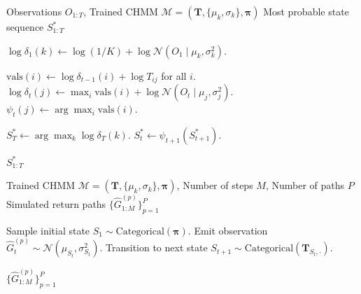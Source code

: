 \newcommand{\algbaumwelch}{\ref{alg:chmm_em}}
\newcommand{\algecmstudentt}{\ref{alg:chmm_em}}
\newcommand{\algemlaplace}{\ref{alg:chmm_em}}

\begin{algorithm}[tp]
\caption{Viterbi decoding for the most likely hidden state sequence}
\label{alg:viterbi}
\small
\begin{algorithmic}[1]
\REQUIRE Observations $O_{1:T}$, Trained CHMM $\mathcal{M} = (\mathbf{T}, \{\mu_k, \sigma_k\}, \boldsymbol{\pi})$
\ENSURE Most probable state sequence $S_{1:T}^*$

    \STATE $\log \delta_1(k) \leftarrow \log(1/K) + \log \mathcal{N}(O_1 \mid \mu_k, \sigma_k^2)$.
\ENDFOR

        \STATE $\text{vals}(i) \leftarrow \log \delta_{t-1}(i) + \log T_{ij}$ for all $i$.
        \STATE $\log \delta_t(j) \leftarrow \max_i \text{vals}(i) + \log \mathcal{N}(O_t \mid \mu_j, \sigma_j^2)$.
        \STATE $\psi_t(j) \leftarrow \arg\max_i \text{vals}(i)$.
    \ENDFOR
\ENDFOR

\STATE $S_T^* \leftarrow \arg\max_k \log \delta_T(k)$.
    \STATE $S_t^* \leftarrow \psi_{t+1}(S_{t+1}^*)$.
\ENDFOR

\RETURN $S_{1:T}^*$
\end{algorithmic}
\end{algorithm}

\begin{algorithm}[tp]
\caption{CHMM simulation of synthetic excess growth rate paths}
\label{alg:chmm_simulate}
\small
\begin{algorithmic}[1]
\REQUIRE Trained CHMM $\mathcal{M} = (\mathbf{T}, \{\mu_k, \sigma_k\}, \boldsymbol{\pi})$, Number of steps $M$, Number of paths $P$
\ENSURE Simulated return paths $\{\hat{G}^{(p)}_{1:M}\}_{p=1}^{P}$

    \STATE Sample initial state $S_1 \sim \text{Categorical}(\boldsymbol{\pi})$.
        \STATE Emit observation $\hat{G}_t^{(p)} \sim \mathcal{N}(\mu_{S_t}, \sigma_{S_t}^2)$.
            \STATE Transition to next state $S_{t+1} \sim \text{Categorical}(\mathbf{T}_{S_t, \cdot})$.
        \ENDIF
    \ENDFOR
\ENDFOR

\RETURN $\{\hat{G}^{(p)}_{1:M}\}_{p=1}^{P}$
\end{algorithmic}
\end{algorithm}

